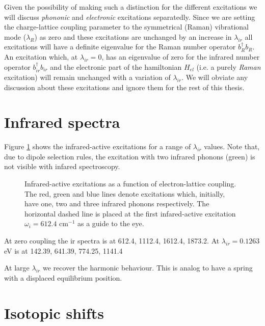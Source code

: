 Given the possibility of making such a distinction for the different excitations we will discuss \textit{phononic} and \textit{electronic} excitations separatedly. 
Since we are setting the charge-lattice coupling parameter to the symmetrical (Raman) vibrational mode ($\lambda_R$) as zero and these excitations are unchanged by an increase in $\lambda_{ir}$ all excitations will have a definite eigenvalue for the Raman number operator $b_R^\dagger b_R$. 
An excitation which, at $\lambda_{ir}=0$, has an eigenvalue of zero for the infrared number operator $b_{ir}^\dagger b_{ir}$ and the electronic part of the hamiltonian $H_{el}$ (i.e. a purely \textit{Raman} excitation) will remain unchanged with a variation of $\lambda_{ir}$.
We will obviate any discussion about these excitations and ignore them for the rest of this thesis. 


\section{Infrared spectra}
\label{sec:irSpectra}

Figure \ref{fig:irSpectra} shows the infrared-active excitations for a range of $\lambda_{ir}$ values.
Note that, due to dipole selection rules, the excitation with two infrared phonons (green) is not visible with infared spectroscopy.

\begin{figure}[h]
  \centering
  
  \caption[Infrared-active excitations as a function of electron-lattice coupling.]
  {Infrared-active excitations as a function of electron-lattice coupling.
  The red, green and blue lines denote excitations which, initially, have one, two and three infrared phonons respectively.
  The horizontal dashed line is placed at the first infared-active excitation $\omega_i=612.4$ cm$^{-1}$ as a guide to the eye.}
  \label{fig:irSpectra}
\end{figure}

At zero coupling the ir spectra is at 612.4, 1112.4, 1612.4, 1873.2.
At $\lambda_{ir}=0.1263$ eV is at 142.39, 641.39, 774.25, 1141.4 

At large $\lambda_{ir}$ we recover the harmonic behaviour. This is analog to have a spring with a displaced equilibrium position.


\section{Isotopic shifts}
\label{sec:irIsotopicShifts}

